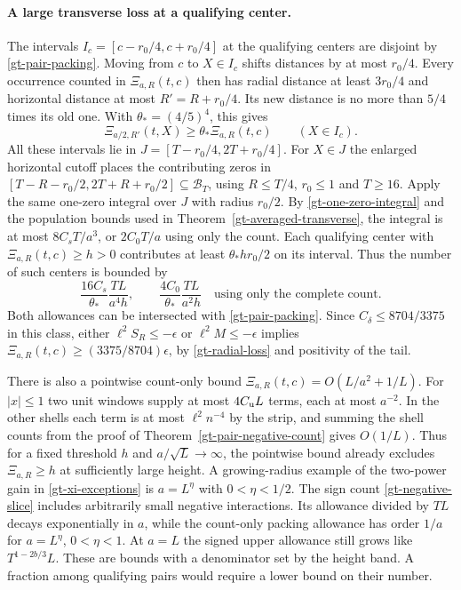 \paragraph{A large transverse loss at a qualifying center.}
The intervals \(I_c=[c-r_0/4,c+r_0/4]\) at the qualifying centers
are disjoint by \eqref{gt-pair-packing}. Moving from \(c\) to
\(X\in I_c\) shifts distances by at most \(r_0/4\).
Every occurrence counted in \(\Xi_{a,R}(t,c)\) then has radial
distance at least \(3r_0/4\) and horizontal distance at most
\(R'=R+r_0/4\). Its new distance is no more than \(5/4\) times its
old one. With \(\theta_*=(4/5)^4\), this gives
\[
 \Xi_{a/2,R'}(t,X)\ge\theta_*\Xi_{a,R}(t,c)\qquad(X\in I_c).
\]
All these intervals lie in \(J=[T-r_0/4,2T+r_0/4]\).
For \(X\in J\) the enlarged horizontal cutoff places the contributing
zeros in \([T-R-r_0/2,2T+R+r_0/2]\subseteq\mathcal B_T\), using
\(R\le T/4\), \(r_0\le1\) and \(T\ge16\).
Apply the same one-zero integral over \(J\) with radius \(r_0/2\).
By \eqref{gt-one-zero-integral} and the population bounds used in
Theorem~\ref{gt-averaged-transverse}, the integral is at most
\(8C_sT/a^3\), or \(2C_0T/a\) using only the count.
Each qualifying center with \(\Xi_{a,R}(t,c)\ge h>0\) contributes
at least \(\theta_*h r_0/2\) on its interval. Thus the number
of such centers is bounded by
\begin{equation}
 \frac{16C_s}{\theta_*}\frac{TL}{a^4h},\qquad
 \frac{4C_0}{\theta_*}\frac{TL}{a^2h}
     \quad\text{using only the complete count}.
 \label{gt-xi-exceptions}
\end{equation}
Both allowances can be intersected with \eqref{gt-pair-packing}.
Since \(C_\delta\le8704/3375\) in this class, either
\(\ell^2 S_R\le-\epsilon\) or \(\ell^2M\le-\epsilon\) implies
\(\Xi_{a,R}(t,c)\ge(3375/8704)\epsilon\), by
\eqref{gt-radial-loss} and positivity of the tail.

There is also a pointwise count-only bound
\(\Xi_{a,R}(t,c)=O(L/a^2+1/L)\). For \(|x|\le1\) two unit windows
supply at most \(4C_{\rm u}L\) terms, each at most \(a^{-2}\).
In the other shells each term is at most \(\ell^2 n^{-4}\) by the
strip, and summing the shell counts from the proof of
Theorem~\ref{gt-pair-negative-count} gives \(O(1/L)\).
Thus for a fixed threshold \(h\) and \(a/\sqrt L\to\infty\), the
pointwise bound already excludes \(\Xi_{a,R}\ge h\) at sufficiently
large height. A growing-radius example of the two-power gain in
\eqref{gt-xi-exceptions} is \(a=L^\eta\) with \(0<\eta<1/2\).
The sign count \eqref{gt-negative-slice} includes arbitrarily small
negative interactions. Its allowance divided by \(TL\) decays
exponentially in \(a\), while the count-only packing allowance
has order \(1/a\) for \(a=L^\eta\), \(0<\eta<1\). At \(a=L\)
the signed upper allowance still grows like \(T^{1-2b/3}L\).
These are bounds with a denominator set by the height band.
A fraction among qualifying pairs would require a lower bound
on their number.

